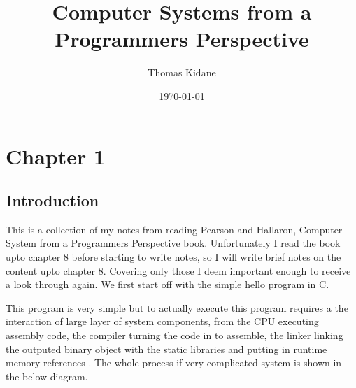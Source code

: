 \documentclass{article}
\title{Computer Systems from a Programmers Perspective}
\author{Thomas Kidane}
\date{\today}
\begin{document}
\maketitle

\section{Chapter 1}


\subsection{Introduction}
This is a collection of my notes from reading Pearson and Hallaron, Computer
System from a Programmers Perspective book. Unfortunately I read the book upto chapter 8 
before starting to write notes, so I will write brief notes on the content upto chapter 8. Covering 
only those I deem important enough to receive a look through again.
We first start off with the simple hello program in C.

\begin{center}
\end{center}

This program is very simple but to actually execute this program requires 
a the interaction of large layer of system components, from the CPU executing 
assembly code, the compiler turning the code in to assemble, the linker linking 
the outputed binary object with the static libraries and putting in runtime memory references
. The whole process if very complicated system is shown in the below diagram.
\end{document}
